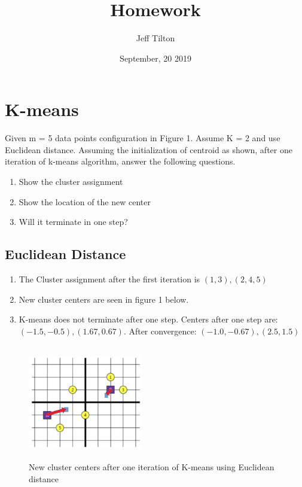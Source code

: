 \documentclass[a4paper]{article}
\title{Homework }
\author{Jeff Tilton}
\date{September, 20 2019}
\begin{document}
\maketitle

\section{K-means}

Given m = 5 data points configuration in Figure 1. Assume K = 2 and use Euclidean distance. Assuming the initialization of centroid as shown, after one iteration of k-means algorithm, answer the following questions.

\begin{enumerate}[label=(\alph*)]
\item Show the cluster assignment
\item Show the location of the new center
\item Will it terminate in one step?
\end{enumerate}

\subsection{Euclidean Distance}

\begin{enumerate}[label=(\alph*)]
\item The Cluster assignment after the first iteration is $(1,3), (2,4,5)$
\item New cluster centers are seen in figure 1 below.
\item K-means does not terminate after one step.  Centers after one step are: $(-1.5, -0.5), (1.67, 0.67)$.  After convergence: $(-1.0, -0.67), (2.5, 1.5)$
\end{enumerate}

\begin{figure}[h]
\includegraphics[width=5cm, height=5cm]{Q1_euclidean.png}
\caption{New cluster centers after one iteration of K-means using Euclidean distance}
\end{figure}
\end{document}
